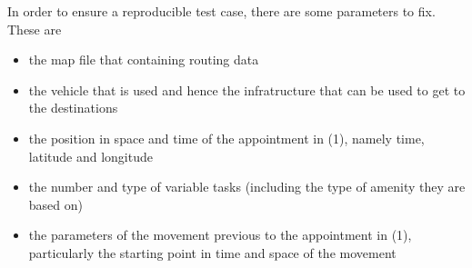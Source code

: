In order to ensure a reproducible  test case, there are some parameters to fix. These are
\begin{itemize}
	\item the map file that containing routing data
	\item the vehicle that is used and hence the infratructure that can be used to get to the destinations
	\item the position in space and time of the appointment in (1), namely time, latitude and longitude
	\item the number and type of variable tasks (including the type of amenity they are based on)
	\item the parameters of the movement previous to the appointment in (1), particularly the starting point in time and space of the movement
\end{itemize}
	
	
